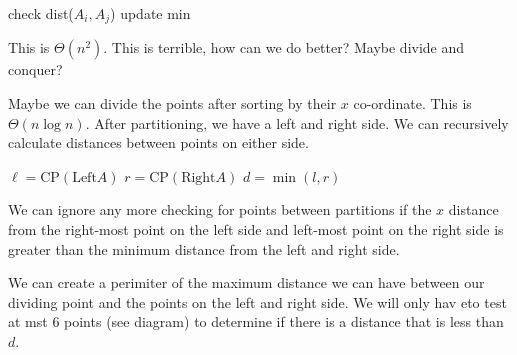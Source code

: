 \documentclass[12pt]{article}
\begin{document}
\begin{algorithmic}
	\STATE check dist($A_i,A_j$)
	\STATE update min
	\ENDIF
	\ENDFOR
	\ENDFOR
\end{algorithmic}

This is $\Theta(n^2)$. This is terrible, how can we do better? Maybe divide and
conquer?

Maybe we can divide the points after sorting by their $x$ co-ordinate. This is
$\Theta(n \log n)$. After partitioning, we have a left and right side. We can
recursively calculate distances between points on either side.

\begin{algorithmic}
	\STATE $\ell = \text{CP}(\text{Left} A)$
	\STATE $r = \text{CP}(\text{Right} A)$
	\STATE $d = \min(l,r)$
\end{algorithmic}

We can ignore any more checking for points between partitions if the $x$
distance from the right-most point on the left side and left-most point on the
right side is greater than the minimum distance from the left and right side.

We can create a perimiter of the maximum distance we can have between our
dividing point and the points on the left and right side. We will only hav eto
test at mst 6 points (see diagram) to determine if there is a distance that is
less than $d$.
\end{document}
